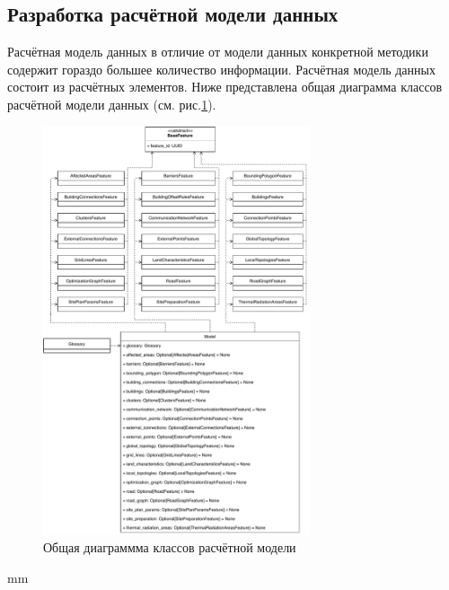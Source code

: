 \subsection{\large{Разработка расчётной модели данных}}

Расчётная модель данных в отличие от модели данных конкретной методики содержит гораздо большее количество информации.
Расчётная модель данных состоит из расчётных элементов. Ниже представлена общая диаграмма классов расчётной модели данных
(см. рис.\ref{pic:implementation__model-classes}).

\begin{figure}[H]
	\hspace*{-2.5 cm}\includegraphics[width=0.7\textwidth]{implementation/pictures/model/classes}
	\caption{Общая диаграммма классов расчётной модели}
	\label{pic:implementation__model-classes}
\end{figure}
 mm

